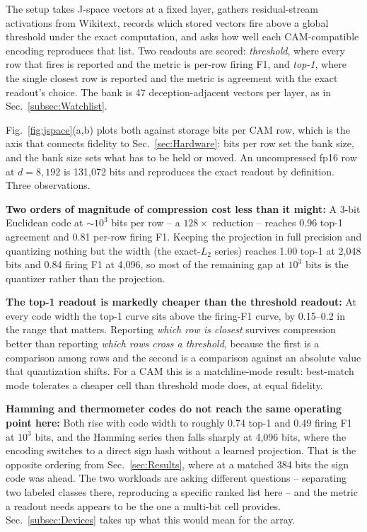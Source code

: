 \documentclass[conference]{IEEEtran}
\newcommand{\cam}{{CAM}\xspace}
\begin{document}
The setup takes J-space vectors at a fixed layer, gathers residual-stream
activations from Wikitext, records which stored vectors fire above a
global threshold under the exact computation, and asks how well each
\cam-compatible encoding reproduces that list. Two readouts are scored:
\emph{threshold}, where every row that fires is reported and the metric
is per-row firing F1, and \emph{top-1}, where the single closest row is
reported and the metric is agreement with the exact readout's choice.
The bank is 47 deception-adjacent vectors per layer, as in
Sec.~\ref{subsec:Watchlist}.

Fig.~\ref{fig:jspace}(a,b) plots both against storage bits per \cam
row, which is the axis that connects fidelity to
Sec.~\ref{sec:Hardware}: bits per row set the bank size, and the bank
size sets what has to be held or moved. An uncompressed fp16 row at
$d=8{,}192$ is 131{,}072 bits and reproduces the exact readout by
definition. Three observations.

\textbf{Two orders of magnitude of compression cost less than it might:}
A 3-bit Euclidean code at $\sim$$10^{3}$ bits per row -- a $128\times$
reduction -- reaches \hbox{0.96} top-1 agreement and 0.81 per-row firing
F1. Keeping the projection in full precision and quantizing nothing but
the width (the exact-$L_2$ series) reaches 1.00 top-1 at 2{,}048 bits and
0.84 firing F1 at 4{,}096, so most of the remaining gap at $10^{3}$ bits
is the quantizer rather than the projection.

\textbf{The top-1 readout is markedly cheaper than the threshold
readout:} At every code width the top-1 curve sits above the firing-F1
curve, by 0.15--0.2 in the range that matters. Reporting \emph{which row
is closest} survives compression better than reporting \emph{which rows
cross a threshold}, because the first is a comparison among rows and the
second is a comparison against an absolute value that quantization
shifts. For a \cam this is a matchline-mode result: best-match mode
tolerates a cheaper cell than threshold mode does, at equal fidelity.

\textbf{Hamming and thermometer codes do not reach the same operating
point here:} Both rise with code width to roughly 0.74 top-1 and 0.49
firing F1 at $10^{3}$ bits, and the Hamming series then falls sharply at
4{,}096 bits, where the encoding switches to a direct sign hash without a
learned projection. That is the opposite ordering from
Sec.~\ref{sec:Results}, where at a matched 384 bits the sign code was
ahead. The two workloads are asking different questions -- separating two
labeled classes there, reproducing a specific ranked list here -- and the
metric a readout needs appears to be the one a multi-bit cell provides.
Sec.~\ref{subsec:Devices} takes up what this would mean for the
array.
\end{document}
